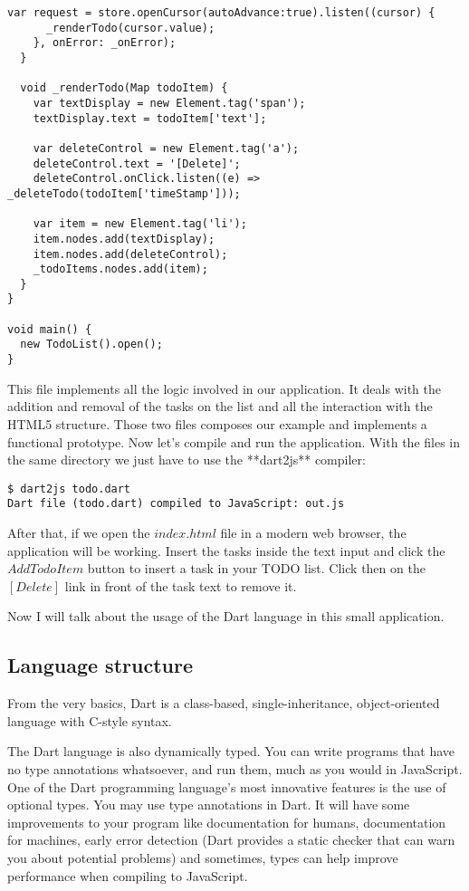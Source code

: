 \begin{lstlisting}[label=dtd,caption=Dart to-do list example]
    var request = store.openCursor(autoAdvance:true).listen((cursor) {
      _renderTodo(cursor.value);
    }, onError: _onError);
  }

  void _renderTodo(Map todoItem) {
    var textDisplay = new Element.tag('span');
    textDisplay.text = todoItem['text'];

    var deleteControl = new Element.tag('a');
    deleteControl.text = '[Delete]';
    deleteControl.onClick.listen((e) => _deleteTodo(todoItem['timeStamp']));

    var item = new Element.tag('li');
    item.nodes.add(textDisplay);
    item.nodes.add(deleteControl);
    _todoItems.nodes.add(item);
  }
}

void main() {
  new TodoList().open();
}
\end{lstlisting}

This file implements all the logic involved in our application. It deals with
the addition and removal of the tasks on the list and all the interaction with
the HTML5 structure. Those two files composes our example and implements a
functional prototype. Now let's compile and run the application. With the files
in the same directory we just have to use the **dart2js** compiler:

\begin{verbatim}
$ dart2js todo.dart
Dart file (todo.dart) compiled to JavaScript: out.js
\end{verbatim}


After that, if we open the $index.html$ file in a modern web browser, the
application will be working. Insert the tasks inside the text input and click
the $Add Todo Item$ button to insert a task in your TODO list. Click then on the
$[Delete]$ link in front of the task text to remove it.

Now I will talk about the usage of the Dart language in this small application.

\subsection{Language structure}

From the very basics, Dart is a class-based, single-inheritance, object-oriented
language with C-style syntax.

The Dart language is also dynamically typed. You can write programs that have no
type annotations whatsoever, and run them, much as you would in JavaScript. One
of the Dart programming language’s most innovative features is the use of
optional types. You may use type annotations in Dart. It will have some
improvements to your program like documentation for humans, documentation for
machines, early error detection (Dart provides a static checker that can warn
you about  potential problems) and sometimes, types can help improve performance
when  compiling to JavaScript.

